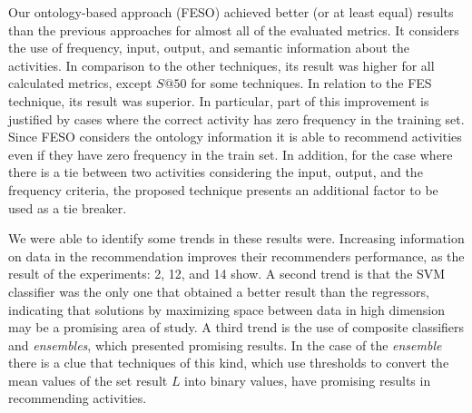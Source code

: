 \documentclass[10pt,letterpaper]{article}
\begin{document}
Our ontology-based approach (FESO) achieved better (or at least equal) results than the previous approaches for almost all of the evaluated metrics. It considers the use of frequency, input, output, and semantic information about the activities. In comparison to the other techniques, its result was higher for all calculated metrics, except \(S@50\) for some techniques. In relation to the FES technique, its result was superior. In particular, part of this improvement is justified by cases where the correct activity has zero frequency in the training set. Since FESO considers the ontology information it is able to recommend activities even if they have zero frequency in the train set. In addition, for the case where there is a tie between two activities considering the input, output, and the frequency criteria, the proposed technique presents an additional factor to be used as a tie breaker.

We were able to identify some trends in these results were. Increasing information on data in the recommendation improves their recommenders performance, as the result of the experiments: 2, 12, and 14 show. A second trend is that the SVM classifier was the only one that obtained a better result than the regressors, indicating that solutions by maximizing space between data in high dimension may be a promising area of ​​study. A third trend is the use of composite classifiers and \emph{ensembles}, which presented promising results. In the case of the \emph{ensemble} there is a clue that techniques of this kind, which use thresholds to convert the mean values ​​of the set result \(L\) into binary values, have promising results in recommending activities.
\end{document}
